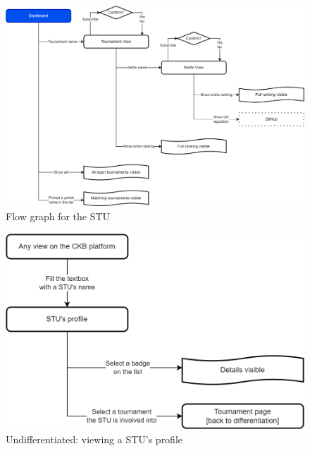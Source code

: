\begin{figure}[H]
    \centering
    \includegraphics[width=\textwidth]{images/UX/UX-STU.drawio.png}
    \caption{Flow graph for the STU}
\end{figure}

\begin{figure}[H]
    \centering
    \includegraphics[width=\textwidth]{images/UX/UX-STU_profile.drawio.png}
    \caption{Undifferentiated: viewing a STU's profile}
\end{figure}